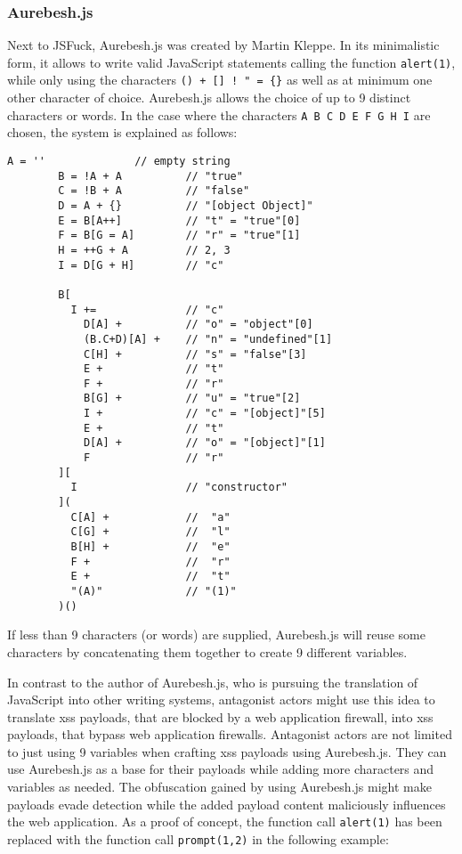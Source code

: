 \subsubsection{Aurebesh.js}
\label{sec:aurebesh}
Next to JSFuck, Aurebesh.js was created by Martin Kleppe. In its minimalistic form, it allows to write valid JavaScript statements calling the function \verb|alert(1)|, while only using the characters \verb|() + [] ! " = {}| as well as at minimum one other character of choice. Aurebesh.js allows the choice of up to 9 distinct characters or words. In the case where the characters \verb|A B C D E F G H I| are chosen, the system is explained as follows:
\begin{lstlisting}[style=basicStyle, caption=Aurebesh.js explanation \cite{mk/aurebesh}, label={lst:aurebeshexplanation}]
		A = ''              // empty string
		B = !A + A          // "true"
		C = !B + A          // "false"
		D = A + {}          // "[object Object]"
		E = B[A++]          // "t" = "true"[0]
		F = B[G = A]        // "r" = "true"[1]
		H = ++G + A         // 2, 3
		I = D[G + H]        // "c"

		B[
		  I +=              // "c"
		    D[A] +          // "o" = "object"[0]
		    (B.C+D)[A] +    // "n" = "undefined"[1]
		    C[H] +          // "s" = "false"[3]
		    E +             // "t"
		    F +             // "r"
		    B[G] +          // "u" = "true"[2]
		    I +             // "c" = "[object]"[5]
		    E +             // "t"
		    D[A] +          // "o" = "[object]"[1]
		    F               // "r"
		][
		  I                 // "constructor"
		](
		  C[A] +            //  "a"
		  C[G] +            //  "l"
		  B[H] +            //  "e"
		  F +               //  "r"
		  E +               //  "t"
		  "(A)"             // "(1)"
		)()
\end{lstlisting}
If less than 9 characters (or words) are supplied, Aurebesh.js will reuse some characters by concatenating them together to create 9 different variables. \cite{mk/aurebesh}

In contrast to the author of Aurebesh.js, who is pursuing the translation of JavaScript into other writing systems, antagonist actors might use this idea to translate \acrshort{xss} payloads, that are blocked by a web application firewall, into \acrshort{xss} payloads, that bypass web application firewalls. Antagonist actors are not limited to just using 9 variables when crafting \acrshort{xss} payloads using Aurebesh.js. They can use Aurebesh.js as a base for their payloads while adding more characters and variables as needed.
The obfuscation gained by using Aurebesh.js might make payloads evade detection while the added payload content maliciously influences the web application.
As a proof of concept, the function call \verb|alert(1)| has been replaced with the function call \verb|prompt(1,2)| in the following example:

